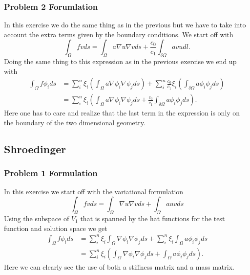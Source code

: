 \documentclass[11pt]{article}
\begin{document}
\subsubsection{Problem 2 Forumlation}
In this exercise we do the same thing as in the previous but we have to take into account the extra terms given by the boundary conditions. We start off with
\begin{equation}
	\int_{\Omega} f v ds = \int_{\Omega} a \nabla u \nabla v ds + \frac{c_0}{c_1}  \int_{\delta \Omega} a v u dl.
\end{equation}
Doing the same thing to this expression as in the previous exercise we end up with
\begin{align}
	\int_{\Omega} f \phi_i ds &=  \sum^n_i \xi_i (\int_{\Omega} a \nabla \phi_i \nabla \phi_j ds) + \sum^n_i \frac{c_0}{c_1} \xi_i (\int_{\delta \Omega} a \phi_i \phi_j ds) \\
	&= \sum^n_i \xi_i ( \int_{\Omega} a \nabla \phi_i \nabla \phi_j ds + \frac{c_0}{c_1} \int_{\delta \Omega} a \phi_i \phi_j ds).
\end{align}
Here one has to care and realize that the last term in the expression is only on the boundary of the two dimensional geometry. 
\subsection{Shroedinger}
\subsubsection{Problem 1 Formulation}
In this exercise we start off with the variational formulation
\begin{equation}
	\int_{\Omega} fv ds= \int_{\Omega} \nabla u \nabla v ds + \int_{\Omega} a u v ds
\end{equation}
Using the subspace of $V_1$ that is spanned by the hat functions for the test function and solution space we get
\begin{align}
	\int_{\Omega} f \phi_i ds &= \sum^n_i \xi_i \int_{\Omega} \nabla \phi_i \nabla \phi_j ds + \sum^n_i \xi_i \int_{\Omega}a \phi_i \phi_j ds \\
	&= \sum^n_i \xi_i ( \int_{\Omega} \nabla \phi_i \nabla \phi_j ds + \int_{\Omega}a \phi_i \phi_j ds).
\end{align}
Here we can clearly see the use of both a stiffness matrix and a mass matrix. 
\end{document}
